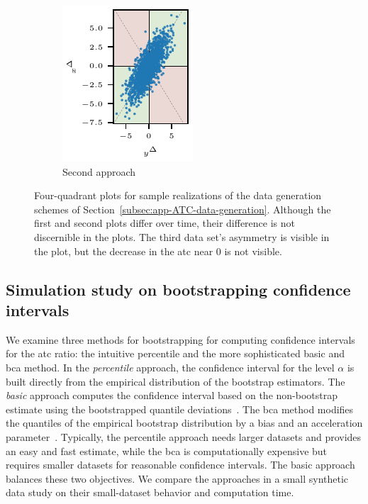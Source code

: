 \documentclass[pdflatex]{sn-jnl}
\theoremstyle{plain}%
\theoremstyle{definition}
\begin{document}
\begin{figure}
\begin{subfigure}{0.24\textwidth}
    \end{subfigure}\hspace{0.01\textwidth}
    \begin{subfigure}{0.24\textwidth}
        \includegraphics{plots/illustrative_examples/appendix_4q_dgp2}
        \caption{Second approach}
    \end{subfigure}
    \caption[Four-quadrant plots for sample realizations of the data generation schemes of Section~\ref{subsec:app-ATC-data-generation}.]{Four-quadrant plots for sample realizations of the data generation schemes of Section~\ref{subsec:app-ATC-data-generation}. Although the first and second plots differ over time, their difference is not discernible in the plots. The third data set's asymmetry is visible in the plot, but the decrease in the \ac{atc} near 0 is not visible. }
    \label{fig:appendix_dgps}
\end{figure}

\subsection{Simulation study on bootstrapping confidence intervals}\label{subsec:appendix-aatc-bootstrap}


We examine three methods for bootstrapping for computing confidence intervals for the \ac{atc} ratio: the intuitive percentile and the more sophisticated basic and \ac{bca} method.
In the \textit{percentile} approach, the confidence interval for the level $\alpha$ is built directly from the empirical distribution of the bootstrap estimators.
The \textit{basic} approach computes the confidence interval based on the non-bootstrap estimate using the bootstrapped quantile deviations~\citep{Davison1997}.
The \ac{bca} method modifies the quantiles of the empirical bootstrap distribution by a bias and an acceleration parameter~\citep{Efron1987}.
Typically, the percentile approach needs larger datasets and provides an easy and fast estimate, while the \ac{bca} is computationally expensive but requires smaller datasets for reasonable confidence intervals.
The basic approach balances these two objectives.
We compare the approaches in a small synthetic data study on their small-dataset behavior and computation time.
\end{document}
